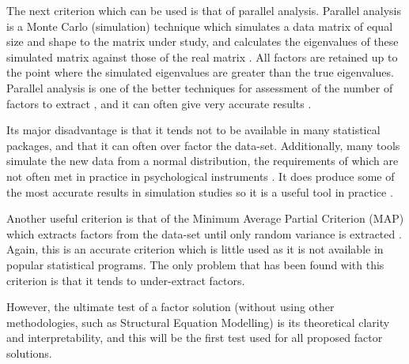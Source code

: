 The next criterion which can be used is that of parallel analysis. Parallel analysis is a Monte Carlo (simulation)  technique which simulates a data matrix of equal size and shape to the matrix under study, and calculates the eigenvalues of these simulated matrix against those of the real matrix \cite{horn1965rationale}. All factors are retained up to the point where the simulated eigenvalues are greater than the true eigenvalues.  Parallel analysis is one of the better techniques for assessment of the number of factors to extract , and it can often give very accurate results \cite{zwick1986comparison}.

Its major disadvantage is that it tends not to be available in many statistical packages, and that it can often over factor the data-set. Additionally, many tools simulate the new data from a normal distribution, the requirements of which are not often met in practice in psychological instruments \cite{micceri1989unicorn}.  It does produce some of the most accurate results in simulation studies so it is a useful tool in practice \cite{zwick1986comparison}. 

Another useful criterion is that of the Minimum Average Partial Criterion (MAP) which extracts factors from the data-set until only random variance is extracted \cite{revelle1979very}. Again, this is an accurate criterion  \cite{zwick1986comparison} which is little used as it is not available in popular statistical programs. The only problem that  has been found with this criterion is that it tends to under-extract factors. %

However, the ultimate test of a factor solution (without using other methodologies, such as Structural Equation Modelling) \cite{joreskog1978structural} is its theoretical clarity and interpretability, and this will be the first test used for all proposed factor solutions.

